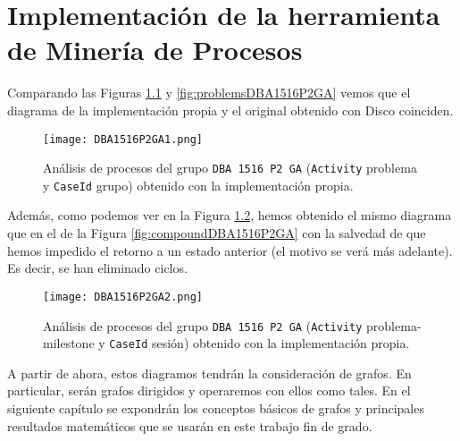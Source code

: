 \chapter{Implementación de la herramienta de Minería de Procesos}

Comparando las Figuras \ref{fig:DBA1516P2GA1} y \ref{fig:problemsDBA1516P2GA} vemos que el diagrama de la implementación propia y el original obtenido con Disco coinciden.

\begin{figure}[H]
    \centering
    \texttt{[image: DBA1516P2GA1.png]}
    \caption{Análisis de procesos del grupo \texttt{DBA 1516 P2 GA} (\texttt{Activity} problema y \texttt{CaseId} grupo) obtenido con la implementación propia.}
    \label{fig:DBA1516P2GA1}
\end{figure}

Además, como podemos ver en la Figura \ref{fig:DBA1516P2GA2}, hemos obtenido el mismo diagrama que en el de la Figura \ref{fig:compoundDBA1516P2GA} con la salvedad de que hemos impedido el retorno a un estado anterior (el motivo se verá más adelante). Es decir, se han eliminado ciclos.

\begin{figure}[H]
    \centering
    \texttt{[image: DBA1516P2GA2.png]}
    \caption{Análisis de procesos del grupo \texttt{DBA 1516 P2 GA} (\texttt{Activity} problema-milestone y \texttt{CaseId} sesión) obtenido con la implementación propia.}
    \label{fig:DBA1516P2GA2}
\end{figure}

A partir de ahora, estos diagramos tendrán la consideración de grafos. En particular, serán grafos dirigidos y operaremos con ellos como tales. En el siguiente capítulo se expondrán los conceptos básicos de grafos y principales resultados matemáticos que se usarán en este trabajo fin de grado.